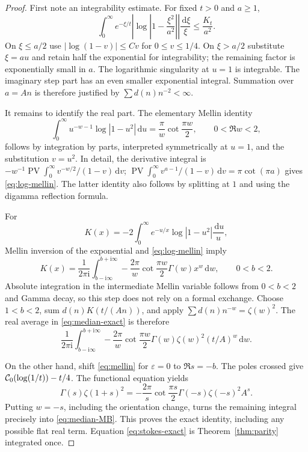 \documentclass[11pt,a4paper]{article}
\numberwithin{equation}{section}
\theoremstyle{definition}\newtheorem{definition}[theorem]{Definition}
\theoremstyle{remark}\newtheorem{remark}[theorem]{Remark}
\newcommand{\PV}{\operatorname{PV}}
\newcommand{\dd}{\,\mathrm d}
\newcommand{\eps}{\varepsilon}
\newcommand{\ii}{\mathrm i}
\begin{document}
\begin{proof}
First note an integrability estimate. For fixed $t>0$ and $a\ge1$,
\[
 \int_0^\infty e^{-\xi/t}
 \left|\log\left|1-\frac{\xi^2}{a^2}\right|\right|
 \frac{\dd\xi}{\xi}\le\frac{K_t}{a^2}.
\]
On $\xi\le a/2$ use $|\log(1-v)|\le C v$ for $0\le v\le1/4$.
On $\xi>a/2$ substitute $\xi=au$ and retain half the exponential
for integrability; the remaining factor is exponentially small in $a$.
The logarithmic singularity at $u=1$ is integrable. The imaginary step
part has an even smaller exponential integral. Summation over $a=An$
is therefore justified by $\sum d(n)n^{-2}<\infty$.

It remains to identify the real part. The elementary Mellin identity
\begin{equation}\label{eq:log-mellin}
 \int_0^\infty u^{-w-1}\log|1-u^2|\dd u
 =\frac\pi w\cot\frac{\pi w}{2},\qquad 0<\Re w<2,
\end{equation}
follows by integration by parts, interpreted symmetrically at $u=1$,
and the substitution $v=u^2$. In detail, the derivative integral is
$-w^{-1}\PV\int_0^\infty v^{-w/2}/(1-v)\dd v$;
$\PV\int_0^\infty v^{a-1}/(1-v)\dd v=\pi\cot(\pi a)$
gives \eqref{eq:log-mellin}. The latter identity also follows by
splitting at $1$ and using the digamma reflection formula.

For
\[
 K(x)=-2\int_0^\infty e^{-u/x}\log|1-u^2|\frac{\dd u}{u},
\]
Mellin inversion of the exponential and \eqref{eq:log-mellin} imply
\begin{equation}\label{eq:K-mellin}
 K(x)=\frac1{2\pi\ii}\int_{b-\ii\infty}^{b+\ii\infty}
 -\frac{2\pi}{w}\cot\frac{\pi w}{2}\Gamma(w)x^w\dd w,
 \qquad 0<b<2.
\end{equation}
Absolute integration in the intermediate Mellin variable follows from
$0<b<2$ and Gamma decay, so this step does not rely on a formal exchange.
Choose $1<b<2$, sum $d(n)K(t/(An))$, and apply
$\sum d(n)n^{-w}=\zeta(w)^2$. The real average in
\eqref{eq:median-exact} is therefore
\begin{equation}\label{eq:median-MB}
 \frac1{2\pi\ii}\int_{b-\ii\infty}^{b+\ii\infty}
 -\frac{2\pi}{w}\cot\frac{\pi w}{2}
 \Gamma(w)\zeta(w)^2(t/A)^w\dd w.
\end{equation}

On the other hand, shift \eqref{eq:mellin} for $\eps=0$ to
$\Re s=-b$. The poles crossed give $\mathcal C_0(\log(1/t))-t/4$.
The functional equation yields
\[
 \Gamma(s)\zeta(1+s)^2
 =-\frac{2\pi}{s}\cot\frac{\pi s}{2}
   \Gamma(-s)\zeta(-s)^2 A^s.
\]
Putting $w=-s$, including the orientation change, turns the remaining
integral precisely into \eqref{eq:median-MB}. This proves the exact
identity, including any possible flat real term. Equation
\eqref{eq:stokes-exact} is Theorem~\ref{thm:parity} integrated once.
\end{proof}
\end{document}
